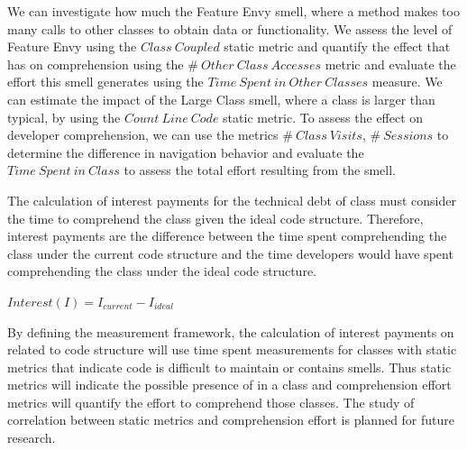 We can investigate how much the Feature Envy smell, where a method makes too many calls to other classes to obtain data or functionality.  We assess the level of Feature Envy using the $Class~Coupled$ static metric and quantify the effect that has on comprehension using the $\#~Other~Class~Accesses$ metric and evaluate the effort this smell generates using the $Time~Spent~in~Other~Classes$ measure.  
We can estimate the impact of the Large Class smell, where a class is larger than typical, by using the $Count~Line~Code$ static metric.  To assess the effect on developer comprehension, we can use the metrics $\#~Class~Visits$, $\#~Sessions$ to determine the difference in navigation behavior and evaluate the $Time~Spent~in~Class$ to assess the total effort resulting from the smell.


The calculation of interest payments for the technical debt of class must consider the time to comprehend the class given the ideal code structure.  Therefore, interest payments are the difference between the time spent comprehending the class under the current code structure and the time developers would have spent comprehending the class under the ideal code structure.

$ Interest(I) = I_{current} - I_{ideal} $

By defining the measurement framework, the calculation of interest payments on \TD related to code structure will use time spent measurements for classes with static metrics that indicate code is difficult to maintain or contains smells.  Thus static metrics will indicate the possible presence of \TD in a class and comprehension effort metrics will quantify the effort to comprehend those classes. The study of correlation between static metrics and comprehension effort is planned for future research.



